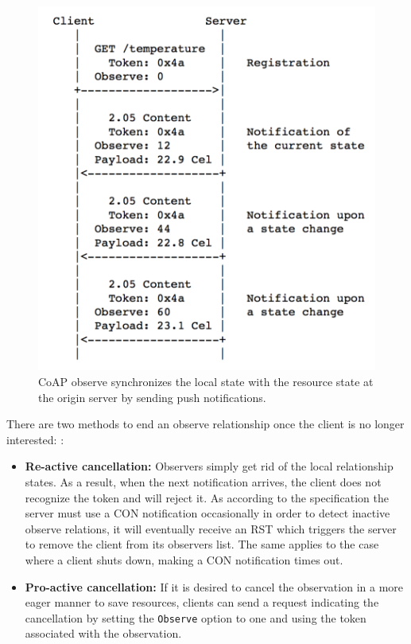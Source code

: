 \begin{figure}[!htbp]
\centering
\includegraphics[scale = 0.55]{coap_observe.png}
\caption[CoAP observe synchronization]{CoAP observe synchronizes the local state with the resource state at the origin server by sending push notifications. \autocite{coap_observe}}
\label{fig:coap_observe}
\end{figure}

There are two methods to end an observe relationship once the client is no longer interested: \autocite{kovatsch2015scalable}:

\begin{itemize}

\item \textbf{Re-active cancellation:} Observers simply get rid of the local relationship states. As a result, when the next notification arrives, the client does not recognize the token and will reject it. As according to the specification the server must use a CON notification occasionally in order to detect inactive observe relations, it will eventually receive an RST which triggers the server to remove the client from its observers list. The same applies to the case where a client shuts down, making a CON notification times out.

\item \textbf{Pro-active cancellation:} If it is desired to cancel the observation in a more eager manner to save resources, clients can send a request indicating the cancellation by setting the \verb|Observe| option to one and using the token associated with the observation.

\end{itemize}

